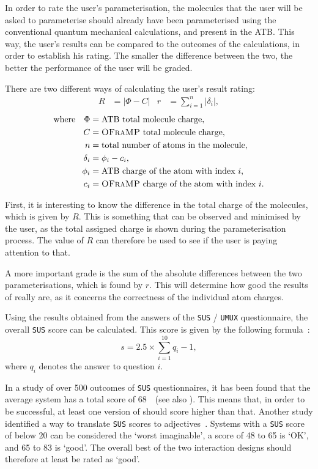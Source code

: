 In order to rate the user's parameterisation, the molecules that the user will be asked to parameterise should already have been parameterised using the conventional quantum mechanical calculations, and present in the ATB. This way, the user's results can be compared to the outcomes of the calculations, in order to establish his rating. The smaller the difference between the two, the better the performance of the user will be graded.

There are two different ways of calculating the user's result rating:
\begin{align*}
R &= |\Phi - C| & r &= \sum_{i = 1}^{n} |\delta_{i}|,
\end{align*}
\vspace{-1em}
\begin{align*}
\text{where} \quad \Phi &= \text{ATB total molecule charge},\\
C &= \text{\textsc{OFraMP}{} total molecule charge},\\
n &= \text{total number of atoms in the molecule},\\
\delta_{i} &= \phi_{i} - c_{i},\\
\phi_{i} &= \text{ATB charge of the atom with index}~i,\\
c_{i} &= \text{\textsc{OFraMP}{} charge of the atom with index}~i.
\end{align*}

First, it is interesting to know the difference in the total charge of the molecules, which is given by $R$. This is something that can be observed and minimised by the user, as the total assigned charge is shown during the parameterisation process. The value of $R$ can therefore be used to see if the user is paying attention to that.

A more important grade is the sum of the absolute differences between the two parameterisations, which is found by $r$. This will determine how good the results of \oframp{} really are, as it concerns the correctness of the individual atom charges.

Using the results obtained from the answers of the \verb|SUS| / \verb|UMUX| questionnaire, the overall \verb|SUS| score can be calculated. This score is given by the following formula~\cite{sauro2011measuring}:
\[
s = 2.5 \times \sum_{i = 1}^{10} q_{i} - 1,
\]
where $q_{i}$ denotes the answer to question $i$.

In a study of over 500 outcomes of \verb|SUS| questionnaires, it has been found that the average system has a total score of $68$~\cite{sauro2011measuring}~(see also ). This means that, in order to be successful, at least one version of \oframp{} should score higher than that. Another study identified a way to translate \verb|SUS| scores to adjectives~\cite{bangor2009determining}. Systems with a \verb|SUS| score of below $20$ can be considered the `worst imaginable', a score of 48 to 65 is `OK', and 65 to 83 is `good'. The overall best of the two interaction designs should therefore at least be rated as `good'.
